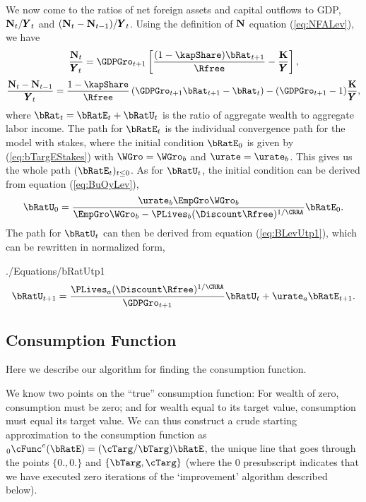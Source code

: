 \documentclass[titlepage]{\econtex}\newcommand{\texname}{cjSOE}
\renewcommand{\GDPLev}{\ensuremath{\pmb{Y}}}
\begin{document}
We now come to the ratios of net foreign assets and capital outflows to GDP, $\NFALev_t/\GDPLev_t$ and $(\NFALev_t -\NFALev_{t-1})/\GDPLev_t$. Using the definition of $\mathbf{N}$ equation (\ref{eq:NFALev}), we have
\begin{equation*}
\frac{\NFALev_t}{\GDPLev_t}=\GDPGro_{t+1} \left[ \frac{(1-\kapShare) \bRat_{t+1}}{\Rfree} -\frac{\KLev}{\GDPLev} \right],
\end{equation*}
\begin{equation*}
\frac{\NFALev_t -\NFALev_{t-1}}{\GDPLev_t}=\frac{1-\kapShare}{\Rfree} \left( \GDPGro_{t+1} \bRat_{t+1} -\bRat_t \right) -(\GDPGro_{t+1}-1)\frac{\KLev}{\GDPLev},
\end{equation*}
where $\bRat_t=\bRatE_t+\bRatU_t$ is the ratio of aggregate wealth to aggregate labor income. The path for $\bRatE_t$ is the individual convergence path for the model with stakes, where the initial condition $\bRatE_0$ is given by (\ref{eq:bTargEStakes}) with $\WGro = \WGro_b$ and $\urate = \urate_b$. This gives us the whole path $(\bRatE_t)_{t \leq 0}$.
As for $\bRatU_t$, the initial condition can be derived from equation (\ref{eq:BuOyLev}),
\begin{equation*}
\bRatU_0= \frac{\urate_b \EmpGro \WGro_b}{\EmpGro \WGro_b -\PLives_b(\Discount \Rfree )^{1/\CRRA}} \bRatE_0.
\end{equation*}
The path for $\bRatU_t$ can then be derived from equation
(\ref{eq:BLevUtp1}), which can be rewritten in normalized form,
\begin{verbatimwrite}{./Equations/bRatUtp1}
\begin{equation*}
\bRatU_{t+1}=\frac{\PLives_a(\Discount \Rfree)^{1/\CRRA}}{\GDPGro_{t+1}} \bRatU_t + \urate_a \bRatE_{t+1}.
\end{equation*}
\end{verbatimwrite}


\subsection{Consumption Function}

Here we describe our algorithm for finding the consumption
function.

We know two points on the ``true'' consumption function: For wealth of
zero, consumption must be zero; and for wealth equal to its target value,
consumption must equal its target value.  We can thus construct a crude starting approximation
to the consumption function as $_0\cFunc^{e}(\bRatE) = (\cTarg/\bTarg)\bRatE$,
the unique line that goes through the points $\{0.,0.\}$ and $\{\bTarg,\cTarg\}$ (where
the 0 presubscript indicates that we have executed zero iterations of the `improvement' algorithm
described below).
\end{document}
